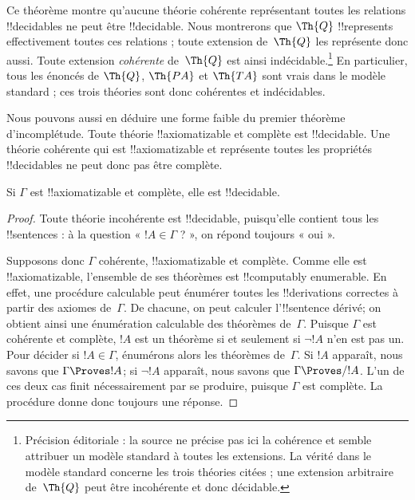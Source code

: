 \documentclass[../../../include/open-logic-section]{subfiles}
\begin{document}
\begin{explain}
Ce théorème montre qu'aucune théorie cohérente représentant toutes
les relations !!{decidable}s ne peut être !!{decidable}. Nous
montrerons que $\Th{Q}$ !!{represents} effectivement toutes ces
relations ; toute extension de~$\Th{Q}$ les représente donc aussi.
Toute extension \emph{cohérente} de~$\Th{Q}$ est ainsi indécidable.\footnote{Précision éditoriale : la source ne précise pas ici la cohérence et semble attribuer un modèle standard à toutes les extensions. La vérité dans le modèle standard concerne les trois théories citées ; une extension arbitraire de~$\Th{Q}$ peut être incohérente et donc décidable.}
En particulier, tous les énoncés de $\Th{Q}$, $\Th{PA}$ et $\Th{TA}$ sont vrais
dans le modèle standard ; ces trois théories sont donc cohérentes et indécidables.

Nous pouvons aussi en déduire une forme faible du premier théorème
d'incomplétude. Toute théorie !!{axiomatizable} et complète est
!!{decidable}. Une théorie cohérente qui est !!{axiomatizable} et
représente toutes les propriétés !!{decidable}s ne peut donc pas être
complète.
\end{explain}

\begin{thm}
Si $\Gamma$ est !!{axiomatizable} et complète, elle est
!!{decidable}.
\end{thm}

\begin{proof}
Toute théorie incohérente est !!{decidable}, puisqu'elle contient
tous les !!{sentence}s : à la question « $!A\in\Gamma$ ? », on
répond toujours « oui ».

Supposons donc $\Gamma$ cohérente, !!{axiomatizable} et complète.
Comme elle est !!{axiomatizable}, l'ensemble de ses théorèmes est
!!{computably enumerable}. En effet, une procédure calculable peut
énumérer toutes les !!{derivation}s correctes à partir des axiomes
de~$\Gamma$. De chacune, on peut calculer l'!!{sentence} dérivé;
on obtient ainsi une énumération calculable des théorèmes de~$\Gamma$.
Puisque $\Gamma$ est cohérente et complète, $!A$ est un théorème
si et seulement si $\lnot !A$ n'en est pas un. Pour décider si
$!A\in\Gamma$, énumérons alors les théorèmes de~$\Gamma$.
Si $!A$ apparaît, nous savons que $\Gamma\Proves !A$;
si $\lnot !A$ apparaît, nous savons que $\Gamma\Proves/ !A$.
L'un de ces deux cas finit nécessairement par se produire, puisque
$\Gamma$ est complète. La procédure donne donc toujours une réponse.
\end{proof}
\end{document}
